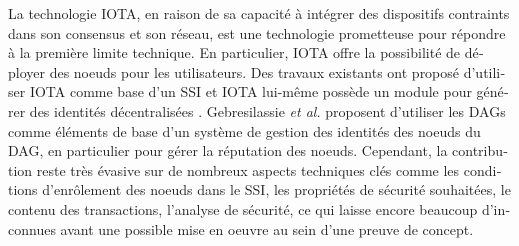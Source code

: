 \begin{otherlanguage}{french}
La technologie IOTA, en raison de sa capacité à intégrer des dispositifs contraints dans son consensus et son réseau, est une technologie prometteuse pour répondre à la première limite technique. En particulier, IOTA offre la possibilité de déployer des noeuds pour les utilisateurs. Des travaux existants ont proposé d'utiliser IOTA comme base d'un SSI \cite{Gebresilassie2020} et IOTA lui-même possède un module pour générer des identités décentralisées \cite{IOTA2020}. Gebresilassie \emph{et al.} proposent d’utiliser les DAGs comme éléments de base d’un système de gestion des identités des noeuds du DAG, en particulier pour gérer la réputation des noeuds. Cependant, la contribution reste très évasive sur de nombreux aspects techniques clés comme les conditions d’enrôlement des noeuds dans le SSI, les propriétés de sécurité souhaitées, le contenu des transactions, l’analyse de sécurité, ce qui laisse encore beaucoup d’inconnues avant une possible mise en oeuvre au sein d’une preuve de concept.

\end{otherlanguage}